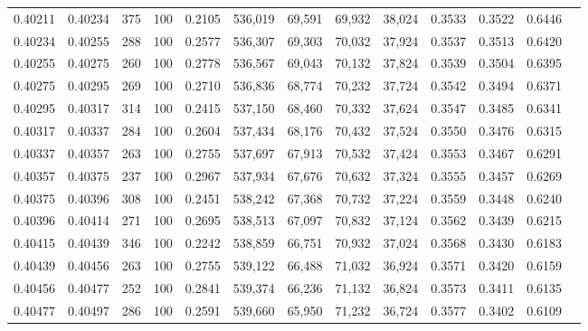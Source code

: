 \begin{tabular}{rrrrrrrrrrrrr}
0.40211 & 0.40234 &   375 & 100 &                                     0.2105 & 536,019 &  69,591 &  69,932 &  38,024 & 0.3533 & 0.3522 & 0.6446 \\
0.40234 & 0.40255 &   288 & 100 &                                     0.2577 & 536,307 &  69,303 &  70,032 &  37,924 & 0.3537 & 0.3513 & 0.6420 \\
0.40255 & 0.40275 &   260 & 100 &                                     0.2778 & 536,567 &  69,043 &  70,132 &  37,824 & 0.3539 & 0.3504 & 0.6395 \\
0.40275 & 0.40295 &   269 & 100 &                                     0.2710 & 536,836 &  68,774 &  70,232 &  37,724 & 0.3542 & 0.3494 & 0.6371 \\
0.40295 & 0.40317 &   314 & 100 &                                     0.2415 & 537,150 &  68,460 &  70,332 &  37,624 & 0.3547 & 0.3485 & 0.6341 \\
0.40317 & 0.40337 &   284 & 100 &                                     0.2604 & 537,434 &  68,176 &  70,432 &  37,524 & 0.3550 & 0.3476 & 0.6315 \\
0.40337 & 0.40357 &   263 & 100 &                                     0.2755 & 537,697 &  67,913 &  70,532 &  37,424 & 0.3553 & 0.3467 & 0.6291 \\
0.40357 & 0.40375 &   237 & 100 &                                     0.2967 & 537,934 &  67,676 &  70,632 &  37,324 & 0.3555 & 0.3457 & 0.6269 \\
0.40375 & 0.40396 &   308 & 100 &                                     0.2451 & 538,242 &  67,368 &  70,732 &  37,224 & 0.3559 & 0.3448 & 0.6240 \\
0.40396 & 0.40414 &   271 & 100 &                                     0.2695 & 538,513 &  67,097 &  70,832 &  37,124 & 0.3562 & 0.3439 & 0.6215 \\
0.40415 & 0.40439 &   346 & 100 &                                     0.2242 & 538,859 &  66,751 &  70,932 &  37,024 & 0.3568 & 0.3430 & 0.6183 \\
0.40439 & 0.40456 &   263 & 100 &                                     0.2755 & 539,122 &  66,488 &  71,032 &  36,924 & 0.3571 & 0.3420 & 0.6159 \\
0.40456 & 0.40477 &   252 & 100 &                                     0.2841 & 539,374 &  66,236 &  71,132 &  36,824 & 0.3573 & 0.3411 & 0.6135 \\
0.40477 & 0.40497 &   286 & 100 &                                     0.2591 & 539,660 &  65,950 &  71,232 &  36,724 & 0.3577 & 0.3402 & 0.6109 \\

\end{tabular}
